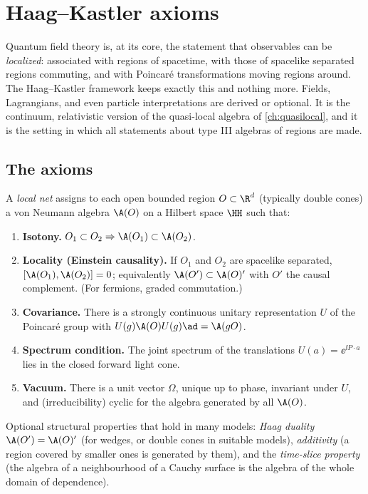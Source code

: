 \chapter{Haag--Kastler axioms}\label{ch:haagkastler}

\begin{physmotiv}
Quantum field theory is, at its core, the statement that observables can be \emph{localized}: associated with regions of spacetime, with those of spacelike separated regions commuting, and with Poincar\'e transformations moving regions around. The Haag--Kastler framework keeps exactly this and nothing more. Fields, Lagrangians, and even particle interpretations are derived or optional. It is the continuum, relativistic version of the quasi-local algebra of \cref{ch:quasilocal}, and it is the setting in which all statements about type III algebras of regions are made.
\end{physmotiv}

\section{The axioms}

A \emph{local net} assigns to each open bounded region $O\subset\R^{d}$ (typically double cones) a von Neumann algebra $\A(O)$ on a Hilbert space $\HH$ such that:
\begin{enumerate}[label=(HK\arabic*)]
\item \textbf{Isotony.} $O_1\subset O_2\Rightarrow\A(O_1)\subset\A(O_2)$.
\item \textbf{Locality (Einstein causality).} If $O_1$ and $O_2$ are spacelike separated, $[\A(O_1),\A(O_2)]=0$; equivalently $\A(O')\subset\A(O)'$ with $O'$ the causal complement. (For fermions, graded commutation.)
\item \textbf{Covariance.} There is a strongly continuous unitary representation $U$ of the Poincar\'e group with $U(g)\A(O)U(g)\ad=\A(gO)$.
\item \textbf{Spectrum condition.} The joint spectrum of the translations $U(a)=\ee^{\ii P\cdot a}$ lies in the closed forward light cone.
\item \textbf{Vacuum.} There is a unit vector $\Omega$, unique up to phase, invariant under $U$, and (irreducibility) cyclic for the algebra generated by all $\A(O)$.
\end{enumerate}
Optional structural properties that hold in many models: \emph{Haag duality} $\A(O')=\A(O)'$ (for wedges, or double cones in suitable models), \emph{additivity} (a region covered by smaller ones is generated by them), and the \emph{time-slice property} (the algebra of a neighbourhood of a Cauchy surface is the algebra of the whole domain of dependence).

